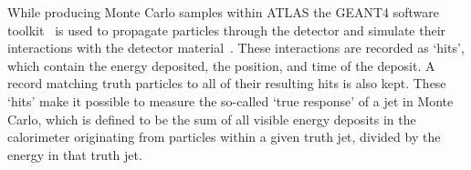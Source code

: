 While producing Monte Carlo samples within ATLAS the {\sc GEANT4} software toolkit~\cite{GEANT4} is used to propagate particles through the detector and simulate their interactions with the detector material~\cite{Aad:2010ah}.  
These interactions are recorded as `hits', which contain the energy deposited, the position, and time of the deposit.  
A record matching truth particles to all of their resulting hits is also kept.  
These `hits' make it possible to measure the so-called `true response' of a jet in Monte Carlo, which is defined to be the sum of all visible energy deposits in the calorimeter originating from particles within a given truth jet, divided by the energy in that truth jet.  
 




